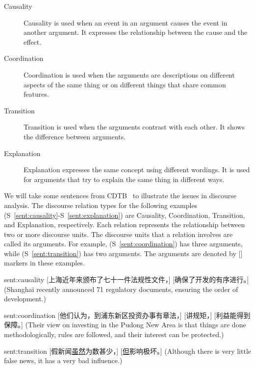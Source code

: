 \begin{description}
\item[Causality] Causality is used when an event in an argument causes the event
    in another argument. It expresses the relationship between the cause
    and the effect.
\item[Coordination] Coordination is used when the arguments are
    descriptions on different aspects of the same thing or
    on different things that share common features.
\item[Transition] Transition is used when the arguments contrast with each other.
    It shows the difference between arguments.
\item[Explanation] Explanation expresses the same concept using different wordings.
    It is used for arguments that try to explain the same thing in different
    ways.
\end{description}


We will take some sentences from CDTB~\citep{li2014building} to illustrate the issues
in discourse analysis. The discourse relation types for the following examples
(S~\ref{sent:causality}-S~\ref{sent:explanation}) are
Causality, Coordination, Transition, and Explanation, respectively.
Each relation represents the relationship between two or more discourse units.
The discourse units that a relation involves are called its arguments.
For example, (S~\ref{sent:coordination}) has
three arguments, while (S~\ref{sent:transition}) has two arguments. The arguments are
denoted by [] markers in these examples.

\begin{sent}{sent:causality}{}
    [上海近年来颁布了七十一件法规性文件，] [确保了开发的有序进行。]
    (Shanghai recently announced 71 regulatory documents, ensuring
    the order of development.)
\end{sent}

\begin{sent}{sent:coordination}{}
    [他们认为，到浦东新区投资办事有章法，] [讲规矩，] [利益能得到保障。]
    (Their view on investing in the Pudong New Area is that
    things are done methodologically,
    rules are followed, and their interest can be protected.)
\end{sent}

\begin{sent}{sent:transition}{}
    [假新闻\underline{虽然}为数甚少，] [\underline{但}影响极坏。]
    (Although there is very little false news, it has a very bad influence.)
\end{sent}

